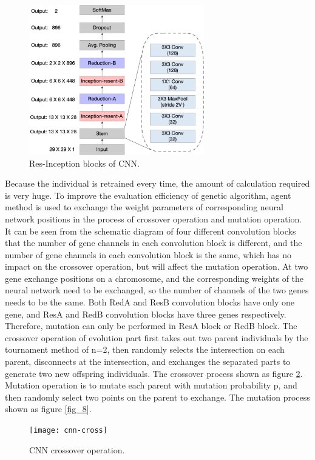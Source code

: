 \documentclass[lettersize,journal]{IEEEtran}
\begin{document}
\begin{figure}[!t]
\centering
\includegraphics[width=3in]{cnn-overall}
\caption{Res-Inception blocks of CNN.}
\label{fig_6}
\end{figure}

Because the individual is retrained every time, the amount of calculation required is very huge. To improve the evaluation efficiency of genetic algorithm, agent method is used to exchange the weight parameters of corresponding neural network positions in the process of crossover operation and mutation operation. 
It can be seen from the schematic diagram of four different convolution blocks that the number of gene channels in each convolution block is different, and the number of gene channels in each convolution block is the same, which has no impact on the crossover operation, but will affect the mutation operation. At two gene exchange positions on a chromosome, and the corresponding weights of the neural network need to be exchanged, so the number of channels of the two genes needs to be the same. Both RedA and ResB convolution blocks have only one gene, and ResA and RedB convolution blocks have three genes respectively. Therefore, mutation can only be performed in ResA block or RedB block.
The crossover operation of evolution part first takes out two parent individuals by the tournament method of n=2, then randomly selects the intersection on each parent, disconnects at the intersection, and exchanges the separated parts to generate two new offspring individuals. The crossover process shown as figure \ref{fig_7}.  Mutation operation is to mutate each parent with mutation probability p, and then randomly select two points on the parent to exchange. The mutation process shown as figure \ref{fig_8}.

\begin{figure}[!t]
\centering
\texttt{[image: cnn-cross]}
\caption{CNN crossover operation.}
\label{fig_7}
\end{figure}
\end{document}
